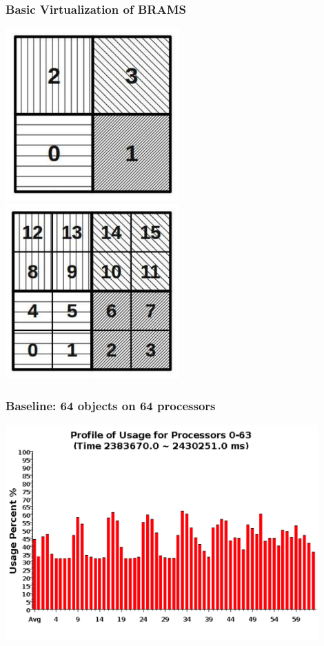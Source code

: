 \begin{frame}[fragile]
\frametitle{Basic Virtualization of BRAMS}
\includegraphics[width=0.5\textwidth]{figures/bramsNonVirtual.png}%
\includegraphics[width=0.5\textwidth]{figures/bramsVirtual.png}
\end{frame}

\begin{frame}[fragile]
\frametitle{Baseline: 64 objects on 64 processors}
\begin{center}\includegraphics[width=0.9\textwidth]{figures/usageNonVirtual.png}\end{center}
\end{frame}

